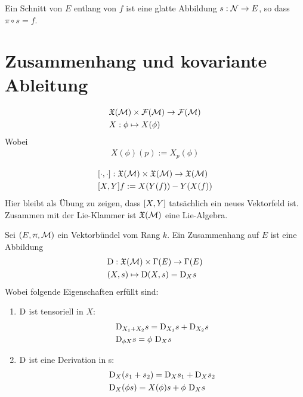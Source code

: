 \begin{defs}
Ein Schnitt von $E$ entlang von $f$ ist eine glatte Abbildung $s : \mathcal{N} \to E$, so dass $\pi \circ s = f$. 
\end{defs}

\section{Zusammenhang und kovariante Ableitung}

\begin{defs}
\begin{align}
&\mathfrak{X}(\mathcal{M}) \times \mathcal{F}(\mathcal{M}) \to \mathcal{F}(\mathcal{M})\\
&X: \phi \mapsto X(\phi)
\end{align}
Wobei
\begin{align}
X(\phi)(p):= X_p (\phi)
\end{align}
\end{defs}


\begin{defs}
\begin{align}
&\comm{\cdot}{\cdot} : \mathfrak{X}(\mfk) \times \mathfrak{X}(\mfk) \to \mathfrak{X}(\mfk)\\
&\comm{X}{Y} f := X(Y(f)) - Y(X(f))
\end{align}
Hier bleibt als Übung zu zeigen, dass $\comm{X}{Y}$ tatsächlich ein neues Vektorfeld ist.\\
Zusammen mit der Lie-Klammer ist $\mathfrak{X}(\mathcal{M})$ eine Lie-Algebra.
\end{defs}

\begin{defs}[Zusammenhang]
Sei $(E, \uppi, \mathcal{M})$ ein Vektorbündel vom Rang $k$.
Ein Zusammenhang auf $E$ ist eine Abbildung
\begin{align}
&\mathrm{D} : \mathfrak{X}(\mathcal{M}) \times \Gamma(E) \to \Gamma (E) \\
&(X, s) \mapsto \mathrm{D} (X, s) = \mathrm{D}_X s
\end{align}
Wobei folgende Eigenschaften erfüllt sind:
\begin{enumerate}
\item $\mathrm{D}$ ist tensoriell in $X$: 
\begin{align}
&\mathrm{D}_{X_1 + X_2} s = \mathrm{D}_{X_1} s + \mathrm{D}_{X_2} s \\
&\mathrm{D}_{\phi X} s = \phi \ \mathrm{D}_X s
\end{align}
\item $\mathrm{D}$ ist eine Derivation in s:
\begin{align}
&\mathrm{D}_X (s_1 + s_2) = \mathrm{D}_X s_1 + \mathrm{D}_X s_2\\
&\mathrm{D}_X (\phi s) = X (\phi) s + \phi \ \mathrm{D}_X  s
\end{align}
\end{enumerate}
\end{defs}

